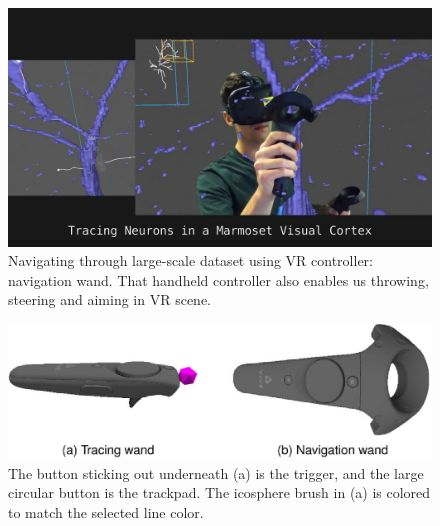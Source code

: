 \documentclass[10pt,twocolumn,letterpaper]{article}
\begin{document}
\begin{figure}[h]
\begin{center}
   \includegraphics[width=1.0\linewidth]{neurou-tracing.png}
\end{center}
   \caption{Navigating through large-scale dataset using VR controller: navigation wand. That handheld controller also enables us throwing, steering and aiming in VR scene.}
\label{fig:neurou-tracing}
\end{figure}

\begin{figure}[h]
\begin{center}
   \includegraphics[width=1.0\linewidth]{wands.png}
\end{center}
   \caption{The button sticking out underneath (a) is
the trigger, and the large circular button is the trackpad. The icosphere
brush in (a) is colored to match the selected line color.}
\label{fig:wands}
\end{figure}
\end{document}
